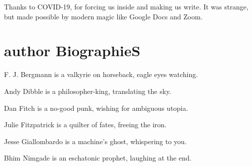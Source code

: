 \begin{flushleft}
Thanks to COVID-19, for forcing us inside and making us write.
It was strange, but made possible by modern magic like Google Docs
and Zoom.


\chapter*{\variexfont{}author BiographieS}

\vspace{2em}
F. J. Bergmann is a valkyrie on horseback, eagle eyes watching.

\vspace{2em}
Andy Dibble is a philosopher-king, translating the sky.

\vspace{2em}
Dan Fitch is a no-good punk, wishing for ambiguous utopia.

\vspace{2em}
Julie Fitzpatrick is a quilter of fates, freeing the iron.

\vspace{2em}
Jesse Giallombardo is a machine's ghost, whispering to you.

\vspace{2em}
Bhim Nimgade is an eschatonic prophet, laughing at the end.

\end{flushleft}




